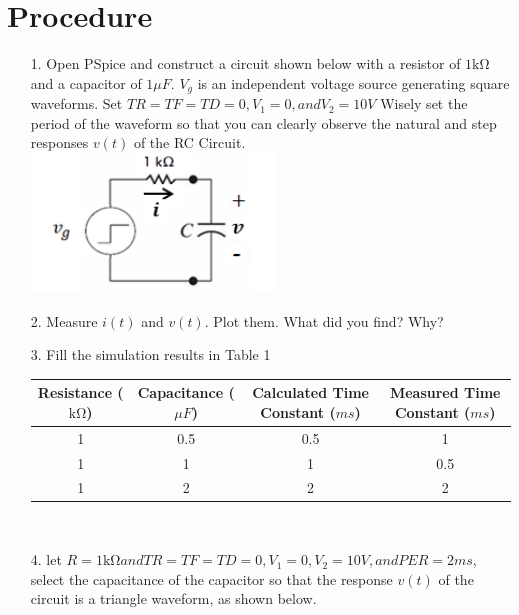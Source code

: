 \documentclass[a4paper]{article}
\begin{document}
\section*{Procedure}
\begin{itemize}
	\item[1.] Open PSpice and construct a circuit shown below with a resistor of $1 \si{\kilo\ohm}$ and a capacitor of $1 \si{\mu}F$. $V_{g}$ is an independent voltage source generating square waveforms. Set $TR = TF = TD = 0, V_{1} = 0, and V_{2} = 10 V$ Wisely set the period of the waveform so that you can clearly observe the natural and step responses $v(t)$ of the RC Circuit. \\
	      \includegraphics[scale=0.5]{image-3.png} \\   
	\item[2.] Measure $i(t)$ and $v(t)$. Plot them. What did you find? Why? \\
	\item[3.] Fill the simulation results in Table 1 \\
	      \begin{tabular}{|c|c|c|c|}
	      	\hline
	      	Resistance ($\si{\kilo\ohm}$) & Capacitance ($\si{\mu}F$) & Calculated Time Constant ($ms$) & Measured Time Constant ($ms$) \\
	      	\hline
	      	1                             & 0.5                       & 0.5                             & 1                             \\
	      	\hline
	      	1                             & 1                         & 1                               & 0.5                           \\
	      	\hline
	      	1                             & 2                         & 2                               & 2                             \\
	      	\hline
	      \end{tabular} \\
	\item[4.] let $R = 1 \si{\kilo\ohm} and TR = TF = TD = 0, V_{1} = 0, V_{2} = 10 V, and PER = 2 ms$, select the capacitance of the capacitor so that the response $v(t)$ of the circuit is a triangle waveform, as shown below. \\

\end{itemize}
\end{document}
